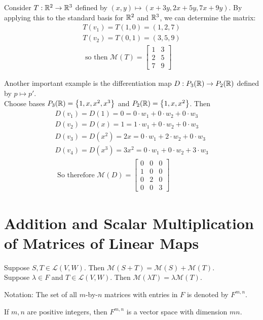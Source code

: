 \documentclass{memoir}
\begin{document}
\begin{exmp}
	Consider $T:\mathbb{R}^2\to \mathbb{R}^3$ defined by $(x,y) \mapsto (x+3y,2x+5y,7x+9y)$. By applying this to the standard basis for $\mathbb{R}^2$ and $\mathbb{R}^3$, we can determine the matrix:
	\begin{align*}
		T(v_1) = T(1,0) = (1,2,7) \\
		T(v_2) = T(0,1) = (3,5,9) \\
		\text{ so then } \mathcal{M}(T) = \begin{bmatrix} 
			1 & 3\\
			2 & 5\\
			7 & 9
		\end{bmatrix} 
	\end{align*}

	Another important example is the differentiation map $D: P_3(\mathbb{R}) \to P_2(\mathbb{R})$ defined by $p \mapsto p'$.\\

	Choose bases $P_3(\mathbb{R}) = \left\{1,x,x^2,x^3 \right\}$ and $P_2(\mathbb{R}) = \left\{1,x,x^2 \right\} $. Then
	\begin{align*}
		D(v_1) = D(1) = 0 = 0\cdot w_1 + 0\cdot w_2 + 0\cdot w_3 \\
		D(v_2) = D(x) = 1 = 1\cdot w_1 + 0 \cdot w_2 + 0 \cdot w_3 \\
		D(v_3) = D(x^2) = 2x = 0\cdot w_1 + 2 \cdot w_2 + 0 \cdot w_3 \\
		D(v_4) = D(x^3) = 3x^2 = 0 \cdot w_1 + 0\cdot w_2 + 3\cdot w_3 \\
		\text{ So therefore } \mathcal{M}(D) = \begin{bmatrix} 
			0 & 0 & 0\\
			1 & 0 & 0\\
			0 & 2 & 0 \\
			0 & 0 & 3 
		\end{bmatrix} 
	\end{align*}
\end{exmp}
\color{black}

\section{Addition and Scalar Multiplication of Matrices of Linear Maps}
\label{sec:addition_and_scalar_multiplication_of_matrices_of_linear_maps}
\begin{cor}
	Suppose $S,T \in \mathcal{L}(V,W)$. Then $\mathcal{M}(S+T) = \mathcal{M}(S) + \mathcal{M}(T)$.\\

	Suppose $\lambda \in F$ and $T \in \mathcal{L}(V,W)$. Then $\mathcal{M}(\lambda T) = \lambda \mathcal{M}(T)$.
\end{cor}
Notation: The set of all $m$-by-$n$ matrices with entries in $F$ is denoted by $F^{m,n}$.
\begin{cor}
	If $m,n$ are positive integers, then $F^{m,n}$ is a vector space with dimension $mn$.
\end{cor}
\end{document}
